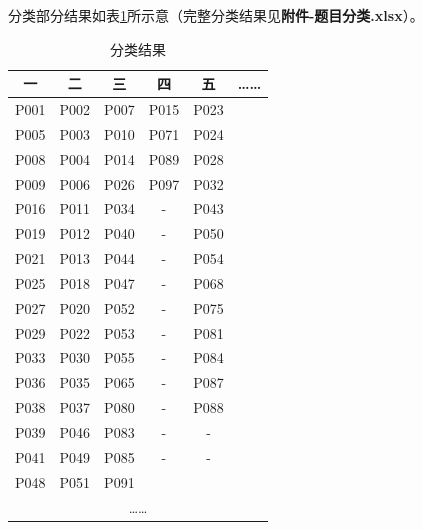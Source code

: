 分类部分结果如表\ref{talbe041618}所示意（完整分类结果见\textbf{附件-题目分类.xlsx}）。

\begin{table}[h]
    \label{talbe041618}
    \caption{分类结果}
    \centering
    \begin{tabular}{@{}cccccc@{}}
        \toprule
        \quad \quad 一 \quad \quad   & \quad \quad 二 \quad \quad  & \quad \quad 三 \quad \quad   & \quad \quad 四 \quad \quad                  & \quad \quad 五 \quad \quad    & \quad \quad …… \quad \quad                  \\ \midrule
        P001 & P002 & P007 & P015                 & P023 &                      \\
        P005 & P003 & P010 & P071                 & P024 &                      \\
        P008 & P004 & P014 & P089                 & P028 &                      \\
        P009 & P006 & P026 & P097                 & P032 &                      \\
        P016 & P011 & P034 &  -                   & P043 &                      \\
        P019 & P012 & P040 &  -                   & P050 &                      \\
        P021 & P013 & P044 &  -                   & P054 &                      \\
        P025 & P018 & P047 &  -                   & P068 &                      \\
        P027 & P020 & P052 &  -                   & P075 &                      \\
        P029 & P022 & P053 &  -                   & P081 &                      \\
        P033 & P030 & P055 &  -                   & P084 &                      \\
        P036 & P035 & P065 &  -                   & P087 &                      \\
        P038 & P037 & P080 &  -                   & P088 &                      \\
        P039 & P046 & P083 &  -                   & -    &                      \\
        P041 & P049 & P085 &  -                   & -    &                      \\
        P048 & P051 & P091 & \multicolumn{1}{l}{} &     & \multicolumn{1}{l}{} \\
        \multicolumn{6}{c}{……}                                                  \\ \bottomrule
        \end{tabular}
\end{table}

